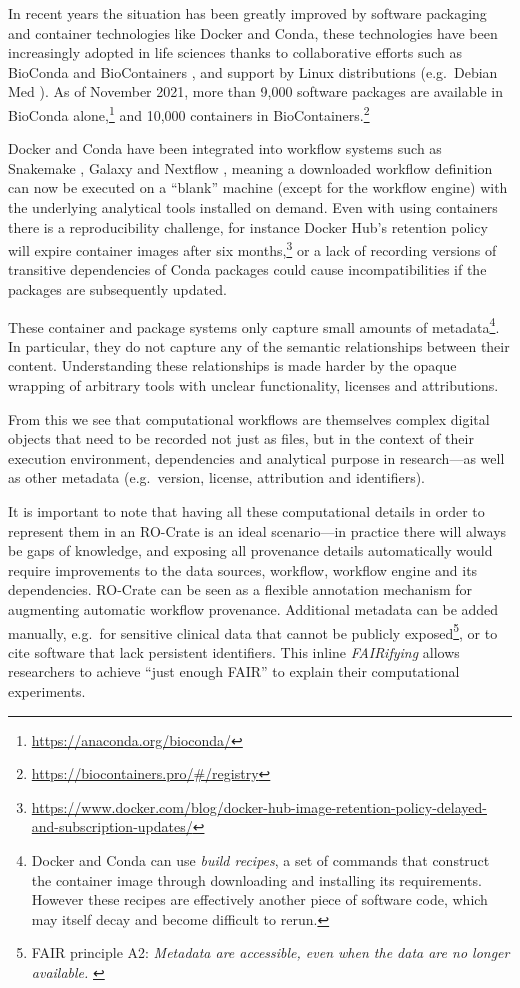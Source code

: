 In recent years the situation has been greatly improved by software
packaging and container technologies like Docker and Conda, these
technologies have been increasingly adopted in life sciences
\cite{Möller 2017} thanks to
collaborative efforts such as BioConda
\cite{Grüning 2018a} and
BioContainers
\cite{da Veiga Leprevost 2017}, and
support by Linux distributions (e.g.~Debian Med
\cite{Möller 2010}). As of
November 2021, more than 9,000 software packages are available in
BioConda alone,\footnote{\url{https://anaconda.org/bioconda/}} and 10,000 containers
in BioContainers.\footnote{\url{https://biocontainers.pro/\#/registry}}

Docker and Conda have been integrated into workflow systems such as
Snakemake
\cite{Köster 2012}, Galaxy
\cite{Afgan 2018} and Nextflow
\cite{Di Tommaso 2017}, meaning
a downloaded workflow definition can now be executed on a ``blank''
machine (except for the workflow engine) with the underlying analytical
tools installed on demand. Even with using containers there is a
reproducibility challenge, for instance Docker Hub's retention policy
will expire container images after six
months,\footnote{\url{https://www.docker.com/blog/docker-hub-image-retention-policy-delayed-and-subscription-updates/}}
or a lack of recording versions of transitive dependencies of Conda
packages could cause incompatibilities if the packages are subsequently updated.

These container and package systems only capture small amounts of
metadata\footnote{Docker and Conda can use \emph{build recipes}, a set
  of commands that construct the container image through downloading and
  installing its requirements. However these recipes are effectively
  another piece of software code, which may itself decay and become
  difficult to rerun.}. In particular, they do not capture any of the
semantic relationships between their content. Understanding these
relationships is made harder by the opaque wrapping of arbitrary tools
with unclear functionality, licenses and attributions.

From this we see that computational workflows are themselves complex
digital objects that need to be recorded not just as files, but in the
context of their execution environment, dependencies and analytical
purpose in research---as well as other metadata (e.g.~version, license,
attribution and identifiers).

It is important to note that having all these computational details in
order to represent them in an RO-Crate is an ideal scenario---in
practice there will always be gaps of knowledge, and exposing all
provenance details automatically would require improvements to the data
sources, workflow, workflow engine and its dependencies. RO-Crate can be
seen as a flexible annotation mechanism for augmenting automatic
workflow provenance. Additional metadata can be added manually, e.g.~for
sensitive clinical data that cannot be publicly exposed\footnote{FAIR
  principle A2: \emph{Metadata are accessible, even when the data are no
  longer available.}
  \cite{Wilkinson 2016}}, or to cite
software that lack persistent identifiers. This inline \emph{FAIRifying}
allows researchers to achieve ``just enough FAIR'' to explain their
computational experiments.

